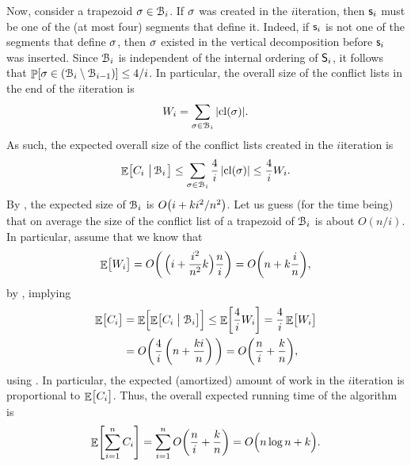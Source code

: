Now, consider a trapezoid $\sigma \in \EuScript{B}_i$. If $\sigma$ was created
in the $i$\th iteration, then $\mathsf{s}_i$ must be one of the (at most
four) segments that define it. Indeed, if $\mathsf{s}_i$ is not one of the
segments that define $\sigma$, then $\sigma$ existed in the vertical
decomposition before $\mathsf{s}_i$ was inserted.  Since $\EuScript{B}_i$ is
independent of the internal ordering of $\mathsf{S}_i$, it follows that
$\Prob{ \sigma \in (\ArrB_i \setminus \ArrB_{i-1})} \leq 4/i$. In
particular, the overall size of the conflict lists in the end of the
$i$\th iteration is
\begin{equation*}
    W_i = \sum_{\sigma \in \EuScript{B}_i} {|{\mathrm{cl}}(\sigma)|}.
\end{equation*}
As such, the expected overall size of the conflict lists created in
the $i$\th iteration is
\begin{equation*}
  \mathop{\mathbb{E}}\!\left[ { C_i \,\left|\, { \EuScript{B}_i } \bigr.\right.} \right] \leq \sum_{\sigma \in \EuScript{B}_i}
  \frac{4}{i} \left| {{\mathrm{cl}}(\sigma)} \right| \leq \frac{4}{i} W_i.
\end{equation*}
By , the expected size of $\EuScript{B}_i$ is $O\pth{i +
   k i^2/n^2}$. Let us guess (for the time being) that on average the
size of the conflict list of a trapezoid of $\EuScript{B}_i$ is about
$O(n/i)$.  In particular, assume that we know that
\begin{equation*}
    \Ex{\bigl. W_i}%
    =%
    O\pth{ \, \Bigl( i + \frac{i^2}{n^2} k \Bigr) \frac{n}{i}}%
    =%
    O\pth{ n + k \frac{i}{n} },
\end{equation*}
by , implying
\begin{align}
    \Ex{\bigl. C_i }%
    &=%
    \Ex{  \Bigl. \ExCond{C_i}{ \bigl. \ArrB_i } }%
    \leq%
    \Ex{ \frac{4}{i} W_i}%
    =%
    \frac{4}{i} \Ex{ \bigl. W_i }%
    \nonumber
    \\
    &=%
    O \pth{ \frac{4}{i}
       \, \pth{n + \frac{k i}{n} } \, }%
    =%
    O\pth{\frac{n}{i} +
       \frac{k}{n}},
    \eqlab{conflict:lists:3}
\end{align}
using .  In particular, the expected
(amortized) amount of work in the $i$\th iteration is proportional to
$\mathop{\mathbb{E}}\!\left[ {\bigl. C_i} \right]$. Thus, the overall expected running time of the
algorithm is
\begin{equation*}
    \Ex{ \sum_{i=1}^{n} C_i }%
    =%
    \sum_{i=1}^{n} O\pth{\frac{n}{i} + \frac{k}{n}}%
    =%
    O\pth{\Bigl. n\log{n} + k }.
\end{equation*}

